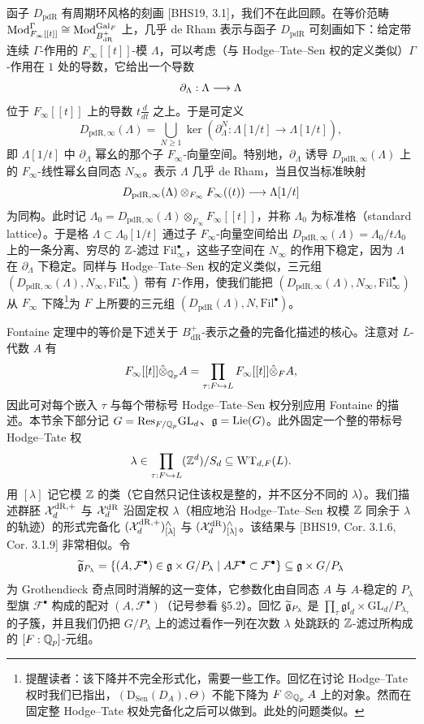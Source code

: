 函子 $D_{\mathrm{pdR}}$ 有周期环风格的刻画 [BHS19, 3.1]，我们不在此回顾。在等价范畴 $\mathrm{Mod}^\Gamma_{F_\infty[[t]]}\cong\mathrm{Mod}^{\operatorname{Gal}_F}_{B^+_{\mathrm{dR}}}$ 上，几乎 de Rham 表示与函子 $D_{\mathrm{pdR}}$ 可刻画如下：给定带连续 $\Gamma$-作用的 $F_\infty[[t]]$-模 $\Lambda$，可以考虑（与 Hodge–Tate–Sen 权的定义类似）$\Gamma$-作用在 $1$ 处的导数，它给出一个导数
\[
\partial_\Lambda:\Lambda\longrightarrow\Lambda
\]
位于 $F_\infty[[t]]$ 上的导数 $t\frac{d}{dt}$ 之上。于是可定义
\[
D_{\mathrm{pdR},\infty}(\Lambda)=\bigcup_{N\ge1}\ker(\partial_\Lambda^N:\Lambda[1/t]\to\Lambda[1/t]),
\]
即 $\Lambda[1/t]$ 中 $\partial_\Lambda$ 幂幺的那个子 $F_\infty$-向量空间。特别地，$\partial_\Lambda$ 诱导 $D_{\mathrm{pdR},\infty}(\Lambda)$ 上的 $F_\infty$-线性幂幺自同态 $N_\infty$。表示 $\Lambda$ 几乎 de Rham，当且仅当标准映射
\[
D_{\mathrm{pdR},\infty}(\Lambda)\otimes_{F_\infty}F_\infty((t))\longrightarrow\Lambda[1/t]
\]
为同构。此时记 $\Lambda_0=D_{\mathrm{pdR},\infty}(\Lambda)\otimes_{F_\infty}F_\infty[[t]]$，并称 $\Lambda_0$ 为标准格（standard lattice）。于是格 $\Lambda\subset\Lambda_0[1/t]$ 通过子 $F_\infty$-向量空间给出 $D_{\mathrm{pdR},\infty}(\Lambda)=\Lambda_0/t\Lambda_0$ 上的一条分离、穷尽的 $\mathbb{Z}$-滤过 $\mathrm{Fil}^\bullet_\infty$，这些子空间在 $N_\infty$ 的作用下稳定，因为 $\Lambda$ 在 $\partial_\Lambda$ 下稳定。同样与 Hodge–Tate–Sen 权的定义类似，三元组 $(D_{\mathrm{pdR},\infty}(\Lambda),N_\infty,\mathrm{Fil}^\bullet_\infty)$ 带有 $\Gamma$-作用，使我们能把 $(D_{\mathrm{pdR},\infty}(\Lambda),N_\infty,\mathrm{Fil}^\bullet_\infty)$ 从 $F_\infty$ 下降\footnote{提醒读者：该下降并不完全形式化，需要一些工作。回忆在讨论 Hodge–Tate 权时我们已指出，$(\mathrm{D}_{\mathrm{Sen}}(D_A),\Theta)$ 不能下降为 $F\otimes_{\mathbb{Q}_p}A$ 上的对象。然而在固定整 Hodge–Tate 权处完备化之后可以做到。此处的问题类似。}为 $F$ 上所要的三元组 $(D_{\mathrm{pdR}}(\Lambda),N,\mathrm{Fil}^\bullet)$。

Fontaine 定理中的等价是下述关于 $B^+_{\mathrm{dR}}$-表示之叠的完备化描述的核心。注意对 $L$-代数 $A$ 有
\[
F_\infty[[t]]\hat\otimes_{\mathbb{Q}_p}A=\prod_{\tau:F\hookrightarrow L}F_\infty[[t]]\hat\otimes_F A,
\]
因此可对每个嵌入 $\tau$ 与每个带标号 Hodge–Tate–Sen 权分别应用 Fontaine 的描述。本节余下部分记 $G=\mathrm{Res}_{F/\mathbb{Q}_p}\mathrm{GL}_d$、$\mathfrak{g}=\mathrm{Lie}(G)$。此外固定一个整的带标号 Hodge–Tate 权
\[
\lambda\in\prod_{\tau:F\hookrightarrow L}(\mathbb{Z}^d)/S_d\subseteq\mathrm{WT}_{d,F}(L).
\]
用 $[\lambda]$ 记它模 $\mathbb{Z}$ 的类（它自然只记住该权是整的，并不区分不同的 $\lambda$）。我们描述群胚 $\mathcal{X}_d^{\mathrm{dR},+}$ 与 $\mathcal{X}_d^{\mathrm{dR}}$ 沿固定权 $\lambda$（相应地沿 Hodge–Tate–Sen 权模 $\mathbb{Z}$ 同余于 $\lambda$ 的轨迹）的形式完备化 $(\mathcal{X}_d^{\mathrm{dR},+})^{\wedge}_{[\lambda]}$ 与 $(\mathcal{X}_d^{\mathrm{dR}})^{\wedge}_{[\lambda]}$。该结果与 [BHS19, Cor. 3.1.6, Cor. 3.1.9] 非常相似。令
\[
\widetilde{\mathfrak{g}}_{P_\lambda}=\{(A,\mathcal F^\bullet)\in\mathfrak{g}\times G/P_\lambda\mid A\mathcal F^\bullet\subset\mathcal F^\bullet\}\subseteq\mathfrak{g}\times G/P_\lambda
\]
为 Grothendieck 奇点同时消解的这一变体，它参数化由自同态 $A$ 与 $A$-稳定的 $P_\lambda$ 型旗 $\mathcal F^\bullet$ 构成的配对 $(A,\mathcal F^\bullet)$（记号参看 §5.2）。回忆 $\widetilde{\mathfrak{g}}_{P_\lambda}$ 是 $\prod_\tau\mathfrak{gl}_d\times\mathrm{GL}_d/P_{\lambda_\tau}$ 的子簇，并且我们仍把 $G/P_\lambda$ 上的滤过看作一列在次数 $\lambda$ 处跳跃的 $\mathbb{Z}$-滤过所构成的 $[F:\mathbb{Q}_p]$-元组。

